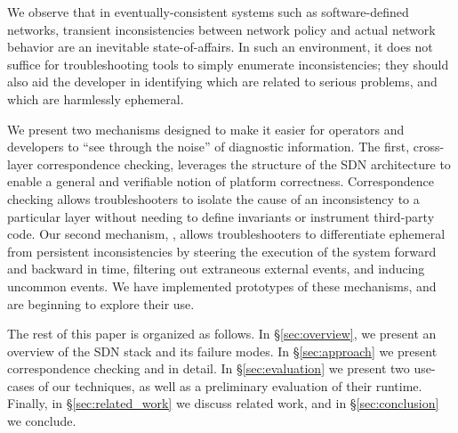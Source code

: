 We observe that in eventually-consistent systems such as software-defined
networks, transient inconsistencies between network policy and actual network
behavior are an inevitable state-of-affairs.
In such an environment, it does not suffice for troubleshooting tools to
simply enumerate inconsistencies; they should also aid the developer
in identifying which are related to serious problems, and which are
harmlessly ephemeral.

We present two mechanisms designed to make it easier for operators and
developers to ``see through the noise'' of diagnostic information. The first,
cross-layer correspondence checking, leverages the structure of the SDN
architecture to enable a general and verifiable notion of platform
correctness. Correspondence checking allows troubleshooters to isolate the
cause of 
an inconsistency to a particular layer without needing to define invariants or
instrument third-party code. Our second
mechanism, \simulator, allows troubleshooters 
to differentiate ephemeral from persistent inconsistencies by steering the
execution of the system forward and backward in time, filtering out extraneous
external events, and inducing uncommon events. We have implemented prototypes
of these mechanisms, and are beginning to
explore their use. 

The rest of this paper is organized as follows. In \S\ref{sec:overview},
we present an overview of the SDN stack and its failure modes.
In \S\ref{sec:approach} we present correspondence checking and
\simulator in detail. In \S\ref{sec:evaluation} we present
two use-cases of our techniques, as well as a preliminary evaluation
of their runtime. Finally, in \S\ref{sec:related_work} we discuss related work,
and in \S\ref{sec:conclusion} we conclude.
